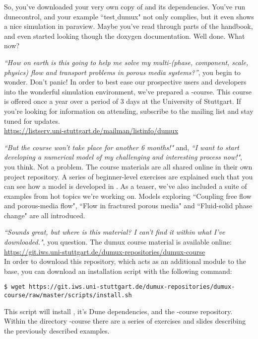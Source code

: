 So, you've downloaded your very own copy of \Dumux and its dependencies.
You've run dunecontrol, and your example ``test$\_$dumux" not only complies,
but it even shows a nice simulation in paraview. 
Maybe you've read through parts of the handbook, and even started looking 
though the doxygen documentation. 
Well done. What now? \\ \linebreak

\textit{``How on earth is this going to help me solve my multi-(phase, component, 
scale, physics) flow and transport problems in porous media systems?''}, you begin to wonder.
Don't panic! In order to best ease our prospective users and developers into the
wonderful \Dumux simulation environment, we've prepared a \Dumux-course. 
This course is offered once a year over a period of 3 days at the University of Stuttgart.
If you're looking for information on attending, subscribe to the \Dumux mailing list 
and stay tuned for updates. \\
\url{https://listserv.uni-stuttgart.de/mailman/listinfo/dumux} \\ \linebreak

\textit{``But the course won't take place for another 6 months!"} and, 
\textit{``I want to start developing a numerical model of my challenging and 
	interesting process now!"}, you think. 
Not a problem. The course materials are all shared online in their own 
\Dumux project repository. A series of beginner-level exercises are explained 
such that you can see how a model is developed in \Dumux. As a teaser, we've
 also included a suite of examples from hot topics we're working on. Models
  exploring ``Coupling free flow and porous-media flow", ``Flow in fractured
   porous media" and ``Fluid-solid phase change" are all introduced.  \\ \linebreak
   
\textit{``Sounds great, but where is this material? I can't find it within
what I've downloaded."}, you question. 
The dumux course material is available online: \\
\url{https://git.iws.uni-stuttgart.de/dumux-repositories/dumux-course} \\
In order to download this repository, which acts as an additional module to 
the \Dumux base, you can download an installation script with the following command:
\begin{lstlisting}[style=Bash]
$ wget https://git.iws.uni-stuttgart.de/dumux-repositories/dumux-course/raw/master/scripts/install.sh
\end{lstlisting}
This script will install \Dumux, it's Dune dependencies, and the \Dumux-course 
repository. Within the directory \Dumux-course there are a series of exercises 
and slides describing the previously described examples. \\ \linebreak

